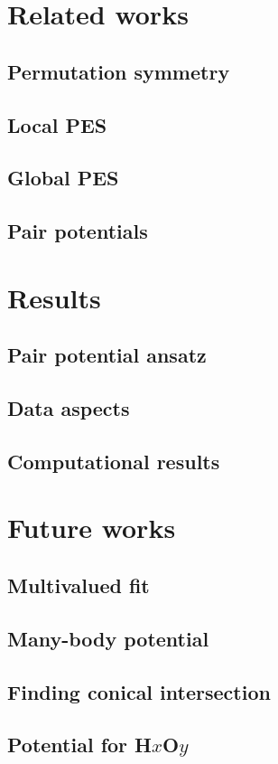 \documentclass{beamer}
\begin{document}
\section{Related works}
\subsection{Permutation symmetry}
\subsection{Local PES}
\subsection{Global PES}
\subsection{Pair potentials}
\section{Results}
\subsection{Pair potential ansatz}
\subsection{Data aspects}
\subsection{Computational results}
\section{Future works}
\subsection{Multivalued fit}
\subsection{Many-body potential}
\subsection{Finding conical intersection}
\subsection{Potential for H$x$O$y$}
\end{document}

